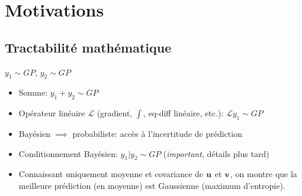 \documentclass[xcolor=svgnames, t]{beamer}
\newcommand{\vectorx}[1]{\boldsymbol{\MakeLowercase{\mathbf{#1}}}}
\newcommand{\coloredemph}[1]{\textcolor{internationalblue}{\emph{#1}}}
\begin{document}
\section{Motivations}
\subsection{Tractabilité mathématique}

\begin{frame}{\subsecname}
  
$y_1 \sim GP$, $y_2 \sim GP$
\begin{itemize}
  \pause
  \item Somme: $y_1 + y_2 \sim GP$
  \pause
  \item Opérateur linéaire $\mathcal{L}$ (gradient, $\int$, eq-diff linéaire, etc.):
  $\mathcal{L}y_1 \sim GP$
  \item Bayésien $\implies$ probabiliste: accès à l'incertitude de prédiction
  \pause
  \item Conditionnement Bayésien: $y_1 | y_2 \sim GP$ (\coloredemph{important}, détails plus tard)
  \pause
  \item Connaissant uniquement moyenne et covariance de $\vectorx{u}$ et $\vectorx{v}$,
  on montre que la meilleure prédiction (en moyenne) est Gaussienne (maximum d'entropie).
\end{itemize}
\end{frame}

\end{document}
